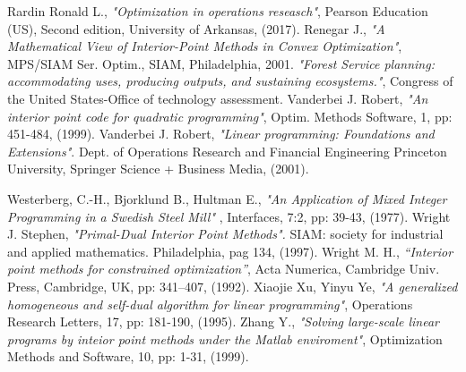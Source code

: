 \documentclass[a4paper,10 pt,titlepage,twoside]{book}
\theoremstyle{plain}
\theoremstyle{definition}
\theoremstyle{remark}
\begin{document}
\begin{thebibliography}{9}
 Rardin Ronald L., \textit{"Optimization in operations reseasch"}, Pearson Education (US), Second edition, University of Arkansas, (2017).
Renegar J., \textit{ "A Mathematical View of Interior-Point Methods in Convex Optimization"}, MPS/SIAM
Ser. Optim., SIAM, Philadelphia, 2001.
 \emph{"Forest Service planning: accommodating uses, producing outputs, and sustaining ecosystems."}, Congress of the United States-Office of technology assessment.
 Vanderbei J. Robert, \emph{\;"An interior point code for quadratic programming"}, Optim. Methods Software, 1, pp: 451-484, (1999). 
 Vanderbei J. Robert, \emph{\;"Linear programming:
Foundations and Extensions"}. Dept. of Operations Research and Financial Engineering
Princeton University, Springer Science + Business Media, (2001).


 Westerberg, C.-H., Bjorklund B., Hultman E., \emph{"An Application of Mixed Integer Programming in a Swedish Steel Mill" }, Interfaces, 7:2, pp: 39-43, (1977).
 Wright J. Stephen, \emph{\;"Primal-Dual Interior Point Methods".} SIAM: society for industrial and applied mathematics. Philadelphia, pag 134, (1997).
Wright M. H.,\textit{ “Interior point methods for constrained optimization”}, Acta Numerica, Cambridge Univ. Press, Cambridge, UK, pp: 341–407, (1992).
Xiaojie Xu, Yinyu Ye, \emph{"A generalized homogeneous and self-dual algorithm for linear programming"}, Operations Research Letters, 17, pp: 181-190, (1995).
Zhang Y.,\textit{ "Solving large-scale linear programs by inteior point methods under
the Matlab enviroment"}, Optimization Methods and Software, 10, pp: 1-31, (1999).
\end{thebibliography}
\end{document}
